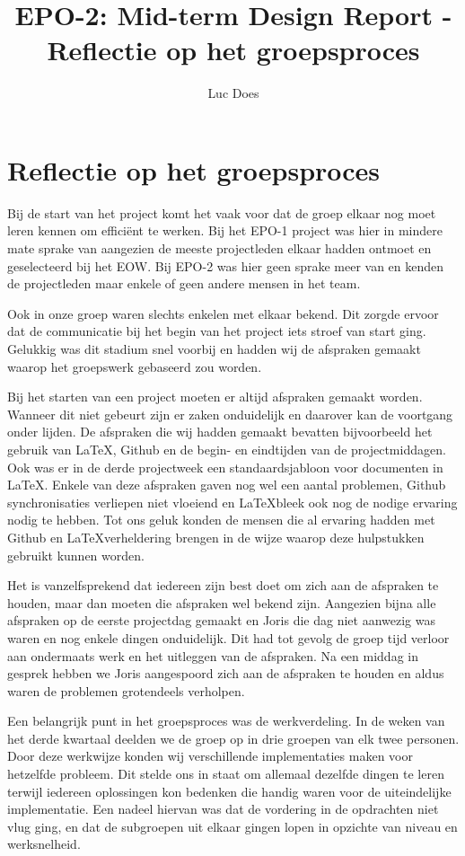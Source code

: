 \documentclass{report}
\title{EPO-2: Mid-term Design Report - Reflectie op het groepsproces}
\author{Luc Does}
\begin{document}
\chapter{Reflectie op het groepsproces}
Bij de start van het project komt het vaak voor dat de groep elkaar nog moet leren kennen om efficiënt te werken. Bij het EPO-1 project was hier in mindere mate sprake van aangezien de meeste projectleden elkaar hadden ontmoet en geselecteerd bij het EOW. Bij EPO-2 was hier geen sprake meer van en kenden de projectleden maar enkele of geen andere mensen in het team.
\newline

Ook in onze groep waren slechts enkelen met elkaar bekend. Dit zorgde ervoor dat de communicatie bij het begin van het project iets stroef van start ging. Gelukkig was dit stadium snel voorbij en hadden wij de afspraken gemaakt waarop het groepswerk gebaseerd zou worden.
\newline

Bij het starten van een project moeten er altijd afspraken gemaakt worden. Wanneer dit niet gebeurt zijn er zaken onduidelijk en daarover kan de voortgang onder lijden. De afspraken die wij hadden gemaakt bevatten bijvoorbeeld het gebruik van \LaTeX, Github en de begin- en eindtijden van de projectmiddagen. Ook was er in de derde projectweek een standaardsjabloon voor documenten in \LaTeX. Enkele van deze afspraken gaven nog wel een aantal problemen, Github synchronisaties verliepen niet vloeiend en \LaTeX  bleek ook nog de nodige ervaring nodig te hebben. Tot ons geluk  konden de mensen die al ervaring hadden met Github en \LaTeX  verheldering brengen in de wijze waarop deze hulpstukken gebruikt kunnen worden.
\newline

Het is  vanzelfsprekend dat iedereen zijn best doet om zich aan de afspraken te houden, maar dan moeten die afspraken wel bekend zijn. Aangezien bijna alle afspraken op de eerste projectdag gemaakt en Joris die dag niet aanwezig was waren en nog enkele dingen onduidelijk. Dit had tot gevolg de groep tijd verloor aan ondermaats werk en het uitleggen van de afspraken. Na een middag in gesprek hebben we Joris aangespoord zich aan de afspraken te houden en aldus waren de problemen grotendeels verholpen.
\newline

Een belangrijk punt in het groepsproces was de werkverdeling. In de weken van het derde kwartaal deelden we de groep op in drie groepen van elk twee personen. Door deze werkwijze konden wij verschillende implementaties maken voor hetzelfde probleem. Dit stelde ons in staat om allemaal dezelfde dingen te leren terwijl iedereen oplossingen kon bedenken die handig waren voor de uiteindelijke implementatie. Een nadeel hiervan was dat de vordering in de opdrachten niet vlug ging, en dat de subgroepen uit elkaar gingen lopen in opzichte van niveau en werksnelheid.
\newline
\end{document}
